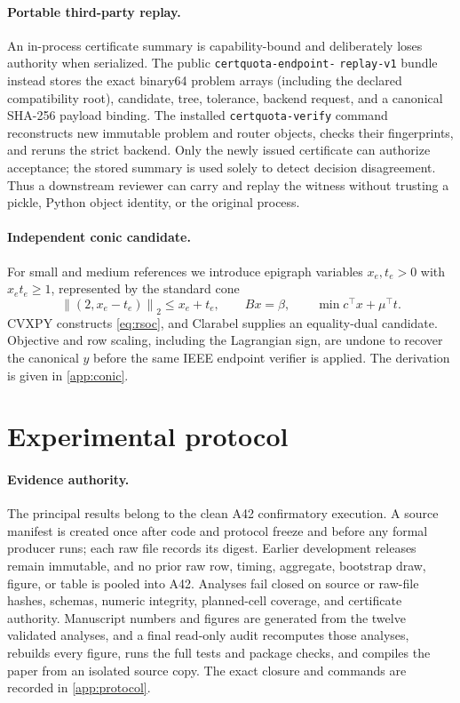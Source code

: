 \documentclass[smallextended,envcountsect]{svjour3}
\newcommand{\norm}[1]{\left\lVert#1\right\rVert}
\begin{document}
\paragraph{Portable third-party replay.}
An in-process certificate summary is capability-bound and deliberately loses
authority when serialized.  The public
\texttt{certquota-}\allowbreak\texttt{endpoint-}\allowbreak
\texttt{replay-v1} bundle instead stores
the exact binary64
problem arrays (including the declared compatibility root), candidate, tree,
tolerance, backend request, and a canonical SHA-256 payload binding.  The
installed \texttt{certquota-verify} command reconstructs new immutable problem
and router objects, checks their fingerprints, and reruns the strict backend.
Only the newly issued certificate can authorize acceptance; the stored summary
is used solely to detect decision disagreement.  Thus a downstream reviewer can
carry and replay the witness without trusting a pickle, Python object identity,
or the original process.

\paragraph{Independent conic candidate.}
For small and medium references we introduce epigraph variables $x_e,t_e>0$
with $x_et_e\ge1$, represented by the standard cone
\begin{equation}
 \norm{(2,x_e-t_e)}_2\le x_e+t_e,
 \qquad Bx=\beta,\qquad
 \min c^\top x+\mu^\top t.
 \label{eq:rsoc}
\end{equation}
CVXPY \citep{diamond2016cvxpy} constructs \cref{eq:rsoc}, and Clarabel
\citep{goulart2026clarabel} supplies an equality-dual candidate.  Objective and
row scaling, including the Lagrangian sign, are undone
to recover the canonical $y$ before the same IEEE endpoint verifier is applied.
The derivation is given in \cref{app:conic}.

\section{Experimental protocol}
\label{sec:experiments}

\paragraph{Evidence authority.}
The principal results belong to the clean A42 confirmatory execution.  A source
manifest is created once after code and protocol freeze and before any formal
producer runs; each raw file records its digest.  Earlier development releases
remain immutable, and no prior raw row, timing, aggregate, bootstrap draw,
figure, or table is pooled into A42.  Analyses fail closed on source or raw-file
hashes, schemas, numeric integrity, planned-cell coverage, and certificate
authority.  Manuscript numbers and figures are generated from the twelve
validated analyses, and a final read-only audit recomputes those analyses,
rebuilds every figure, runs the full tests and package checks, and compiles the
paper from an isolated source copy.  The exact closure and commands are recorded
in \cref{app:protocol}.
\end{document}
